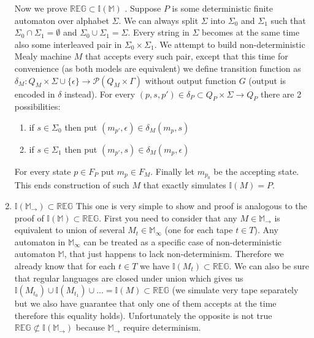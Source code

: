 \documentclass[12pt]{article}
\begin{document}
\begin{enumerate}
 Now we prove $\mathbb{REG} \subset \mathbb{I}(\mathbb{M})$ . Suppose $P$ is some deterministic finite automaton over alphabet $\Sigma$. We can always split $\Sigma$ into $\Sigma_0$ and $\Sigma_1$ such that $\Sigma_0 \cap \Sigma_1 = \emptyset$ and $\Sigma_0 \cup \Sigma_1 = \Sigma$. Every string in $\Sigma$ becomes at the same time also some interleaved pair in $\Sigma_0 \times \Sigma_1$. We attempt to build non-deterministic Mealy machine $M$ that accepts every such pair, except that this time for convenience (as both models are equivalent) we define transition function as $\delta_M : Q_M \times \Sigma \cup \{\epsilon\} \rightarrow \mathcal{P}(Q_M \times \Gamma)$ without output function $G$ (output is encoded in $\delta$ instead).  For every $(p,s,p') \in \delta_P \subset Q_P \times \Sigma \rightarrow Q_P$ there are 2 possibilities: 
\begin{enumerate}
	\item if $s \in \Sigma_0$ then put $(m_{p'},\epsilon) \in \delta_M(m_p,s) $ 
	\item if $s \in \Sigma_1$ then put $(m_{p'},s) \in \delta_M(m_p,\epsilon) $ 
\end{enumerate}
For every state $p \in F_P$ put $m_p \in F_M$. Finally let $m_{p_0}$ be the accepting state. This ends construction of such $M$  that exactly simulates $\mathbb{I}(M) = P$.

\item $\mathbb{I}(\mathbb{M}_\rightarrow) \subset \mathbb{REG}$ This one is very simple to show and proof is analogous to the proof of $\mathbb{I}(\mathbb{M}) \subset \mathbb{REG}$. First you need to consider that any $M \in \mathbb{M}_\rightarrow$ is equivalent to union of several $M_t \in\mathbb{M}_\infty$ (one for each tape $t \in T$). Any automaton in $\mathbb{M}_\infty$ can be treated as a specific case of non-deterministic automaton $\mathbb{M}$, that just happens to lack non-determinism. Therefore we already know that for each $t\in T$ we have $\mathbb{I}(M_t) \subset \mathbb{REG}$. We can also be sure that regular languages are closed under union which gives us $\mathbb{I}(M_{t_0}) \cup \mathbb{I}(M_{t_1}) \cup ... = \mathbb{I}(M) \subset \mathbb{REG}$ (we simulate very tape separately but we also have guarantee that only one of them accepts at the time therefore this equality holds). Unfortunately the opposite is not true $\mathbb{REG} \not\subset \mathbb{I}(\mathbb{M}_\rightarrow) $ because $\mathbb{M}_\rightarrow$ require determinism.



 \end{enumerate}
\end{document}

